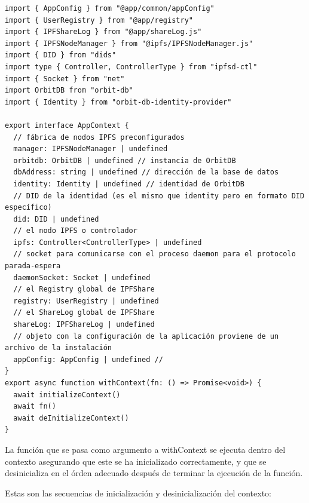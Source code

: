 \begin{verbatim}
import { AppConfig } from "@app/common/appConfig"
import { UserRegistry } from "@app/registry"
import { IPFShareLog } from "@app/shareLog.js"
import { IPFSNodeManager } from "@ipfs/IPFSNodeManager.js"
import { DID } from "dids"
import type { Controller, ControllerType } from "ipfsd-ctl"
import { Socket } from "net"
import OrbitDB from "orbit-db"
import { Identity } from "orbit-db-identity-provider"

export interface AppContext {
  // fábrica de nodos IPFS preconfigurados
  manager: IPFSNodeManager | undefined
  orbitdb: OrbitDB | undefined // instancia de OrbitDB
  dbAddress: string | undefined // dirección de la base de datos
  identity: Identity | undefined // identidad de OrbitDB
  // DID de la identidad (es el mismo que identity pero en formato DID específico)
  did: DID | undefined 
  // el nodo IPFS o controlador
  ipfs: Controller<ControllerType> | undefined 
  // socket para comunicarse con el proceso daemon para el protocolo parada-espera
  daemonSocket: Socket | undefined 
  // el Registry global de IPFShare
  registry: UserRegistry | undefined
  // el ShareLog global de IPFShare
  shareLog: IPFShareLog | undefined
  // objeto con la configuración de la aplicación proviene de un archivo de la instalación
  appConfig: AppConfig | undefined // 
}
export async function withContext(fn: () => Promise<void>) {
  await initializeContext()
  await fn()
  await deInitializeContext()
}
\end{verbatim}
La función que se pasa como argumento a withContext se ejecuta dentro del contexto asegurando que este se ha inicializado correctamente, y que se desinicializa en el órden adecuado después de terminar la ejecución de la función.

Estas son las secuencias de inicialización y desinicialización del contexto:


